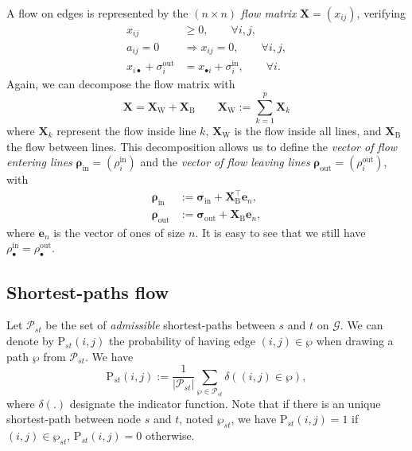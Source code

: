 \documentclass[11p]{article}
\begin{document}
A flow on edges is represented by the $(n \times n)$ \emph{flow matrix} $\mathbf{X} = (x_{ij})$, verifying
\begin{align}
x_{ij} &\geq 0, \qquad \forall i,j, \\
a_{ij} = 0 &\Rightarrow x_{ij} = 0, \qquad \forall i,j, \\ 
x_{i\bullet} + \sigma^\text{out}_i &= x_{\bullet i} + \sigma^\text{in}_i, \qquad \forall i.
\end{align}
Again, we can decompose the flow matrix with 
\begin{equation}
\mathbf{X} = \mathbf{X}_\text{W} + \mathbf{X}_\text{B} \qquad \mathbf{X}_\text{W} := \sum_{k=1}^p \mathbf{X}_k
\end{equation}
where $\mathbf{X}_k$ represent the flow inside line $k$, $\mathbf{X}_\text{W}$ is the flow inside all lines, and $\mathbf{X}_\text{B}$ the flow between lines. This decomposition allows us to define 
the \emph{vector of flow entering lines} $\bm{\rho}_\text{in} = (\rho^\text{in}_i)$ and the \emph{vector of flow leaving lines} $\bm{\rho}_\text{out} = (\rho^\text{out}_i)$, with
\begin{align}
\bm{\rho}_\text{in} &:= \bm{\sigma}_\text{in} + \mathbf{X}^\top_\text{B} \mathbf{e}_n, \\
\bm{\rho}_\text{out} &:= \bm{\sigma}_\text{out} + \mathbf{X}_\text{B} \mathbf{e}_n,
\end{align}
where $\mathbf{e}_n$ is the vector of ones of size $n$. It is easy to see that we still have $\rho^\text{in}_\bullet = \rho^\text{out}_\bullet$. \\

\subsection{Shortest-paths flow}

Let $\mathcal{P}_{st}$ be the set of \emph{admissible} shortest-paths between $s$ and $t$ on $\mathcal{G}$. We can denote by $\text{P}_{st}(i, j)$ the probability of having edge $(i, j) \in \wp$ when drawing a path $\wp$ from $\mathcal{P}_{st}$. We have 
\begin{equation}
\text{P}_{st}(i, j) := \frac{1}{|\mathcal{P}_{st}|}\sum_{\wp \in \mathcal{P}_{st}} \delta((i, j) \in \wp),
\end{equation}
where $\delta(.)$ designate the indicator function. Note that if there is an unique shortest-path between node $s$ and $t$, noted $\wp_{st}$, we have $\text{P}_{st}(i, j) = 1$ if $(i, j) \in \wp_{st}$,  $\text{P}_{st}(i, j) = 0$ otherwise. \\
\end{document}
